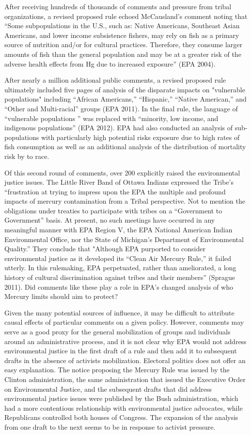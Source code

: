 After receiving hundreds of thousands of comments and pressure from tribal organizations, a revised proposed rule echoed McCausland's comment noting that ``Some subpopulations in the U.S., such as: Native Americans, Southeast Asian Americans, and lower income subsistence fishers, may rely on fish as a primary source of nutrition and/or for cultural practices. Therefore, they consume larger amounts of fish than the general population and may be at a greater risk of the adverse health effects from Hg due to increased exposure'' (EPA 2004). 

After nearly a million additional public comments, a revised proposed rule ultimately included five pages of analysis of the disparate impacts on "vulnerable populations" including ``African Americans,'' ``Hispanic,'' ``Native American,'' and ``Other and Multi-racial'' groups (EPA 2011). In the final rule, the language of ``vulnerable populations '' was replaced with ``minority, low income, and indigenous populations'' (EPA 2012). EPA had also conducted an analysis of sub-populations with particularly high potential risks exposure due to high rates of fish consumption as well as an additional analysis of the distribution of mortality risk by to race.

Of this second round of comments, over 200 explicitly raised the environmental justice issues. The Little River Band of Ottawa Indians expressed the Tribe's ``frustration at trying to impress upon the EPA the multiple and profound impacts of mercury contamination from a Tribal perspective. Not to mention the obligations under treaties to participate with tribes on a “Government to Government” basis. At present, no such meetings have occurred in any meaningful manner with EPA Region V, the EPA National American Indian Environmental Office, nor the State of Michigan’s Department of Environmental Quality.'' They conclude that "Although EPA purported to consider environmental justice as it developed its “Clean Air Mercury Rule,” it failed utterly. In this rulemaking, EPA perpetuated, rather than ameliorated, a long history of cultural discrimination against tribes and their members'' (Sprague 2011). Did comments like these play a role in EPA's changed analysis of who Mercury limits should aim to protect?

Given the many potential sources of influence, it may be difficult to attribute causal effects of particular comments on a given policy. However, comments may serve as a good proxy for the general mobilization of groups and individuals around an administrative process, and it is not clear why EPA would not address environmental justice in the first draft of a rule and then add it to subsequent drafts in the absence of activists mobilization. Electoral politics does not offer an easy explanation. The notice proposing the Mercury Rule was issued by the Clinton administration, the same administration that issued the Executive Order on Environmental Justice, and the subsequent drafts that did address environmental justice issues were published by the Bush administration, which had a more contentious relationship with environmental justice advocates, while Republicans controlled both houses of Congress. The expansion of the analysis from one draft to the next seems to be in response to activist pressure. 


